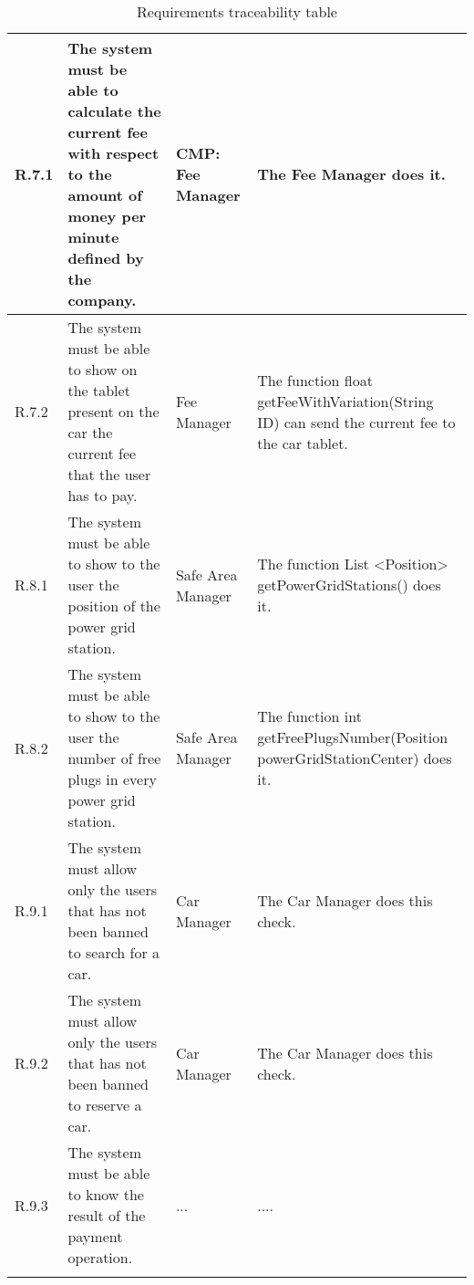 \begin{center}
\begin{longtable}{|p{}|p{}|>{\raggedright\arraybackslash}p{}|>{\raggedright\arraybackslash}p{}|}
R.7.1 & The system must be able to calculate the current fee with respect to the amount of money per minute defined by the company. & CMP: Fee Manager & The Fee Manager does it. \\ \hline
R.7.2 & The system must be able to show on the tablet present on the car the current fee that the user has to pay. & Fee Manager & The function float getFeeWithVariation(String ID) can send the current fee to the car tablet. \\ \hline
R.8.1 & The system must be able to show to the user the position of the power grid station. & Safe Area Manager & The function List \textless Position\textgreater{} getPowerGridStations() does it. \\ \hline
R.8.2 & The system must be able to show to the user the number of free plugs in every power grid station. & Safe Area Manager & The function int getFreePlugsNumber(Position powerGridStationCenter) does it. \\ \hline
R.9.1 & The system must allow only the users that has not been banned to search for a car. & Car Manager & The Car Manager does this check. \\ \hline
R.9.2 & The system must allow only the users that has not been banned to reserve a car. & Car Manager & The Car Manager does this check. \\ \hline
R.9.3 & The system must be able to know the result of the payment operation. & ... & .... \\ \hline

\caption{Requirements traceability table} 
\label{tab:reqTraceTable}
\end{longtable} 
\end{center}